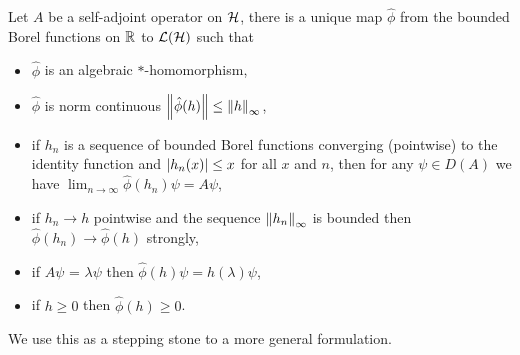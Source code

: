 \begin{thm}\label{thm:spectral-sa-ops-bounded-functions}
    Let $A$ be a self-adjoint operator on $\mathcal{H}$, there is a unique map $\hat{\phi}$ from the bounded Borel functions on $\mathbb{R}$ to $\bops[\hcal]$ such that
    \begin{itemize}
      \item $\hat{\phi}$ is an algebraic $*$-homomorphism,
      \item $\hat{\phi}$ is norm continuous ${\left\lVert{\hat{\phi}(h)}\right\rVert} \leq {\left\lVert{h}\right\rVert}_\infty$,
      \item if $h_n$ is a sequence of bounded Borel functions converging (pointwise) to the identity function and ${\left\lvert{h_n(x)}\right\rvert} \leq x$ for all $x$ and $n$, then for any $\psi\in D(A)$ we have $\lim_{n\to\infty} \hat{\phi}(h_n)\psi = A\psi$,
      \item if $h_n \to h$ pointwise and the sequence ${\left\lVert{h_n}\right\rVert}_\infty$ is bounded then $\hat{\phi}(h_n) \to \hat{\phi}(h)$ strongly,
      \item if $A\psi$ = $\lambda\psi$ then $\hat{\phi}(h)\psi = h(\lambda)\psi$,
      \item if $h\geq 0$ then $\hat{\phi}(h) \geq 0$.
    \end{itemize}
\end{thm}

We use this as a stepping stone to a more general formulation.


